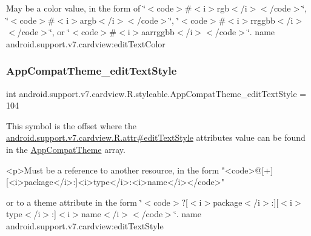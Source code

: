May be a color value, in the form of \char`\"{}$<$code$>$\#$<$i$>$rgb$<$/i$>$$<$/code$>$\char`\"{}, \char`\"{}$<$code$>$\#$<$i$>$argb$<$/i$>$$<$/code$>$\char`\"{}, \char`\"{}$<$code$>$\#$<$i$>$rrggbb$<$/i$>$$<$/code$>$\char`\"{}, or \char`\"{}$<$code$>$\#$<$i$>$aarrggbb$<$/i$>$$<$/code$>$\char`\"{}.  name android.\+support.\+v7.\+cardview\+:edit\+Text\+Color \mbox{\label{classandroid_1_1support_1_1v7_1_1cardview_1_1R_1_1styleable_aa67cb5a7db3afa80cebeb9fad0404dff}} 
\subsubsection{\texorpdfstring{App\+Compat\+Theme\+\_\+edit\+Text\+Style}{AppCompatTheme\_editTextStyle}}
{\footnotesize\ttfamily int android.\+support.\+v7.\+cardview.\+R.\+styleable.\+App\+Compat\+Theme\+\_\+edit\+Text\+Style = 104\hspace{0.3cm}{\ttfamily [static]}}

This symbol is the offset where the \hyperlink{classandroid_1_1support_1_1v7_1_1cardview_1_1R_1_1attr_a00e37547cae9047bd31b90ba0052d707}{android.\+support.\+v7.\+cardview.\+R.\+attr\#edit\+Text\+Style} attribute\textquotesingle{}s value can be found in the \hyperlink{classandroid_1_1support_1_1v7_1_1cardview_1_1R_1_1styleable_a52e6f69f954ecc2622d72c0b4d298938}{App\+Compat\+Theme} array.

\begin{DoxyVerb}      <p>Must be a reference to another resource, in the form "<code>@[+][<i>package</i>:]<i>type</i>:<i>name</i></code>"
\end{DoxyVerb}
 or to a theme attribute in the form \char`\"{}$<$code$>$?\mbox{[}$<$i$>$package$<$/i$>$\+:\mbox{]}\mbox{[}$<$i$>$type$<$/i$>$\+:\mbox{]}$<$i$>$name$<$/i$>$$<$/code$>$\char`\"{}.  name android.\+support.\+v7.\+cardview\+:edit\+Text\+Style \mbox{\label{classandroid_1_1support_1_1v7_1_1cardview_1_1R_1_1styleable_a2e70ceeae7e1d05bbc4fc942d0a8f7c5}} 
